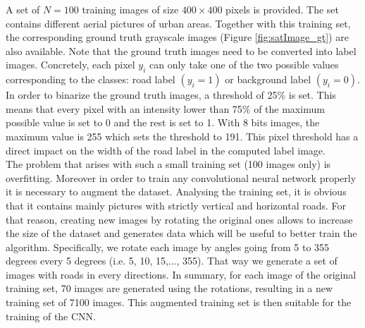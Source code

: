 \documentclass[10pt,conference,compsocconf]{IEEEtran}
\begin{document}
A set of $N = 100$ training images of size $400 \times 400$ pixels is provided. The set contains different aerial pictures of urban areas. Together with this training set, the corresponding ground truth grayscale images (Figure \ref{fig:satImage_gt}) are also available. Note that the ground truth images need to be converted into label images. Concretely, each pixel $y_i$ can only take one of the two possible values corresponding to the classes: road label $(y_i=1)$ or background label $(y_i=0)$. In order to binarize the ground truth images, a threshold of 25\% is set. This means that every pixel with an intensity lower than 75\% of the maximum possible value is set to 0 and the rest is set to 1. With 8 bits images, the maximum value is 255 which sets the threshold to 191. This pixel threshold has a direct impact on the width of the road label in the computed label image.\\
The problem that arises with such a small training set (100 images only) is overfitting. Moreover in order to train any convolutional neural network properly it is necessary to augment the dataset. Analysing the training set, it is obvious that it contains mainly pictures with strictly vertical and horizontal roads. For that reason, creating new images by rotating the original ones allows to increase the size of the dataset and generates data which will be useful to better train the algorithm. Specifically, we rotate each image by angles going from 5 to 355 degrees every 5 degrees (i.e. 5, 10, 15,..., 355). That way we generate a set of images with roads in every directions. In summary, for each image of the original training set, 70 images are generated using the rotations, resulting in a new training set of 7100 images. This augmented training set is then suitable for the training of the CNN. \\
\end{document}
